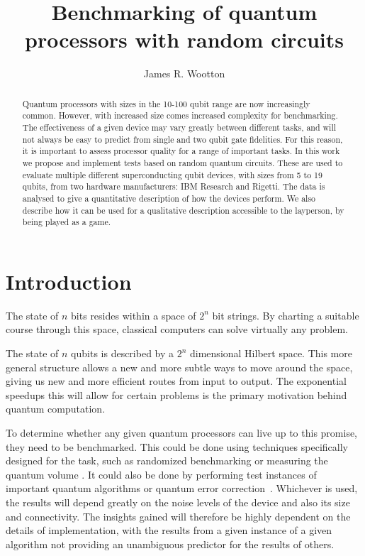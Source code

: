 \documentclass[aps,prl,twocolumn,showpacs,preprintnumbers]{revtex4-1}
\begin{document}
\title{Benchmarking of quantum processors with random circuits}
\author{James R. Wootton}


\begin{abstract}

Quantum processors with sizes in the 10-100 qubit range are now increasingly common. However, with increased size comes increased complexity for benchmarking. The effectiveness of a given device may vary greatly between different tasks, and will not always be  easy to predict from single and two qubit gate fidelities. For this reason, it is important to assess processor quality for a range of important tasks. In this work we propose and implement tests based on random quantum circuits. These are used to evaluate multiple different superconducting qubit devices, with sizes from 5 to 19 qubits, from two hardware manufacturers: IBM Research and Rigetti. The data is analysed to give a quantitative description of how the devices perform.  We also describe how it can be used for a qualitative description accessible to the layperson, by being played as a game.


\end{abstract}



\maketitle


\section{Introduction}

The state of $n$ bits resides within a space of $2^n$ bit strings. By charting a suitable course through this space, classical computers can solve virtually any problem.

The state of $n$ qubits is described by a $2^n$ dimensional Hilbert space. This more general structure allows a new and more subtle ways to move around the space, giving us new and more efficient routes from input to output. The exponential speedups this will allow for certain problems is the primary motivation behind quantum computation.

To determine whether any given quantum processors can live up to this promise, they need to be benchmarked. This could be done using techniques specifically designed for the task, such as randomized benchmarking \cite{emerson:05,magesan:11} or measuring the quantum volume \cite{moll:17}. It could also be done by performing test instances of important quantum algorithms \cite{coles:18} or quantum error correction~\cite{wootton:18,naveh:18}. Whichever is used, the results will depend greatly on the noise levels of the device and also its size and connectivity. The insights gained will therefore be highly dependent on the details of implementation, with the results from a given instance of a given algorithm not providing an unambiguous predictor for the results of others.
\end{document}
